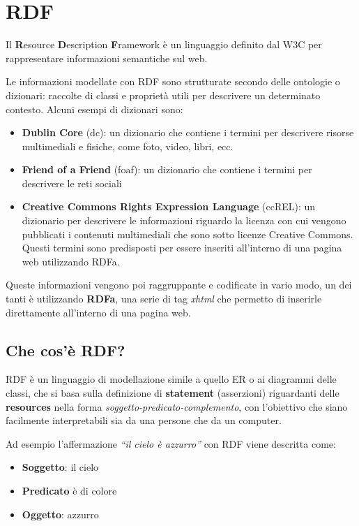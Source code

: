 \chapter{RDF}

Il \textbf{R}esource \textbf{D}escription \textbf{F}ramework è un linguaggio definito dal W3C per rappresentare informazioni semantiche sul web.

Le informazioni modellate con RDF sono strutturate secondo delle ontologie o dizionari: raccolte di classi e proprietà utili per descrivere un determinato contesto. Alcuni esempi di dizionari sono:

\begin{itemize}
	\item \textbf{Dublin Core} (dc):  un dizionario che contiene i termini per descrivere risorse multimediali e fisiche, come foto, video, libri, ecc.
	\item \textbf{Friend of a Friend} (foaf): un dizionario che contiene i termini per descrivere le reti sociali
	\item \textbf{Creative Commons Rights Expression Language} (ccREL): un dizionario per descrivere le informazioni riguardo la licenza con cui vengono pubblicati i contenuti multimediali che sono sotto licenze Creative Commons. Questi termini sono predisposti per essere inseriti all'interno di una pagina web utilizzando RDFa.
\end{itemize}

\noindent Queste informazioni vengono poi raggruppante e codificate in vario modo, un dei tanti è utilizzando \textbf{RDFa}, una serie di tag \textit{xhtml} che permetto di inserirle direttamente all'interno di una pagina web.

\section{Che cos'è RDF?}

RDF è un linguaggio di modellazione simile a quello ER o ai diagrammi delle classi, che si basa sulla definizione di \textbf{statement} (asserzioni) riguardanti delle \textbf{resources} nella forma \textit{soggetto-predicato-complemento}, con l'obiettivo che siano facilmente interpretabili sia da una persone che da un computer.

Ad esempio l'affermazione \textit{``il cielo è azzurro''} con RDF viene descritta come:

\begin{itemize}
	\item \textbf{Soggetto}: il cielo
	\item \textbf{Predicato} è di colore
	\item \textbf{Oggetto}: azzurro
\end{itemize}

